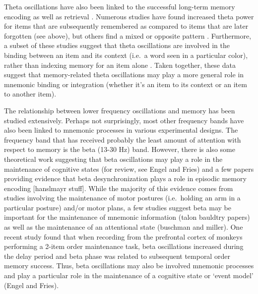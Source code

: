 Theta oscillations have also been linked to the successful long-term
memory encoding
\autocites{guderian_medial_2009}{fell_medial_2011}{sederberg_theta_2003}{friese_successful_2013}{summerfield_coherent_2005}{staudigl_theta_2013}{white_theta_2013}{pastotter_distinct_2014}{osipova_theta_2006}{hanslmayr_relationship_2011}
as well as retrieval
\autocites{jacobs_eeg_2006}{addante_prestimulus_2011}{osipova_theta_2006}{bastiaansen_i_2008}{watrous_frequency-specific_2013}.
Numerous studies have found increased theta power for items that are
subsequently remembered as compared to items that are later forgotten
(see above), but others find a mixed or opposite pattern
\autocites{long_subsequent_2014}{burke_synchronous_2013}{greenberg_decreases_2015}{pastotter_distinct_2014}.
Furthermore, a subset of these studies suggest that theta oscillations
are involved in the binding between an item and its context (i.e.~a word
seen in a particular color), rather than indexing memory for an item
alone \autocites{summerfield_coherent_2005}{staudigl_theta_2013}. Taken
together, these data suggest that memory-related theta oscillations may
play a more general role in mnemonic binding or integration (whether
it's an item to its context or an item to another item).

The relationship between lower frequency oscillations and memory has
been studied extensively. Perhaps not surprisingly, most other frequency
bands have also been linked to mnemonic processes in various
experimental designs. The frequency band that has received probably the
least amount of attention with respect to memory is the beta (13-30 Hz)
band. However, there is also some theoretical work suggesting that beta
oscillations may play a role in the maintenance of cognitive states (for
review, see Engel and Fries) and a few papers providing evidence that
beta desynchronization plays a role in episodic memory encoding
{[}hanslmayr stuff{]}. While the majority of this evidence comes from
studies involving the maintenance of motor postures (i.e.~holding an arm
in a particular posture) and/or motor plans, a few studies suggest beta
may be important for the maintenance of mnemonic information (talon
bauldtry papers) as well as the maintenance of an attentional state
(buschman and miller). One recent study found that when recording from
the prefrontal cortex of monkeys performing a 2-item order maintenance
task, beta oscillations increased during the delay period and beta phase
was related to subsequent temporal order memory success. Thus, beta
oscillations may also be involved mnemonic processes and play a
particular role in the maintenance of a cognitive state or `event model'
(Engel and Fries).

